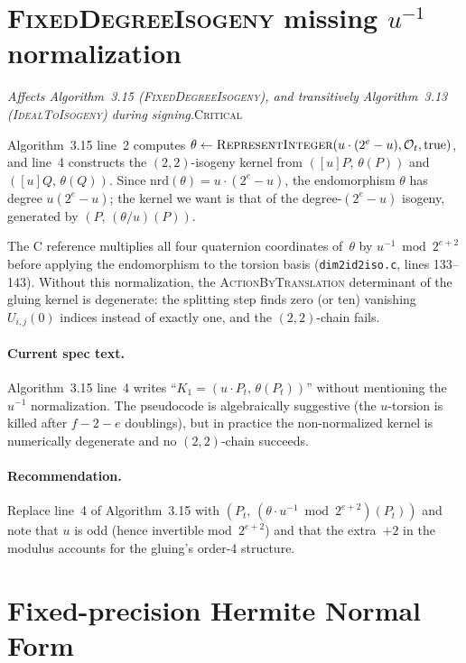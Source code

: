 \documentclass[a4paper,11pt]{article}
\newcommand{\algo}[1]{Algorithm~#1}
\newcommand{\critical}{\textsc{\color{BrickRed}Critical}}
\newcommand{\finding}[2]{\noindent\textit{#1}\hfill#2\par\smallskip}
\begin{document}
\section{\textsc{FixedDegreeIsogeny} missing $u^{-1}$ normalization}
\label{sec:u-inv}

\finding{Affects \algo{3.15}
(\textsc{FixedDegreeIsogeny}), and transitively \algo{3.13}
(\textsc{IdealToIsogeny}) during signing.}{\critical}

\algo{3.15} line~2 computes
$\theta \leftarrow \textsc{RepresentInteger}(u \cdot (2^{e} - u),
\mathcal{O}_t, \mathrm{true})$, and line~4 constructs the
$(2,2)$-isogeny kernel from $([u]P,\, \theta(P))$ and
$([u]Q,\, \theta(Q))$.  Since $\mathrm{nrd}(\theta) = u \cdot
(2^{e} - u)$, the endomorphism $\theta$ has degree
$u (2^{e} - u)$; the kernel we want is that of the degree-$(2^{e}-u)$
isogeny, generated by $(P,\, (\theta/u)(P))$.

The C reference multiplies all four quaternion coordinates of~$\theta$
by $u^{-1} \bmod 2^{e+2}$ before applying the endomorphism to the
torsion basis (\texttt{dim2id2iso.c}, lines 133--143).  Without this
normalization, the \textsc{ActionByTranslation} determinant of the
gluing kernel is degenerate: the splitting step finds zero (or ten)
vanishing~$U_{i,j}(0)$ indices instead of exactly one, and the
$(2,2)$-chain fails.

\paragraph{Current spec text.}
\algo{3.15} line~4 writes ``$K_1 = (u \cdot P_t,\, \theta(P_t))$''
without mentioning the $u^{-1}$ normalization.  The pseudocode is
algebraically suggestive (the $u$-torsion is killed after $f{-}2{-}e$
doublings), but in practice the non-normalized kernel is numerically
degenerate and no $(2,2)$-chain succeeds.

\paragraph{Recommendation.}
Replace line~4 of \algo{3.15} with
$(P_t,\, (\theta \cdot u^{-1} \bmod 2^{e+2})(P_t))$ and note
that $u$ is odd (hence invertible mod~$2^{e+2}$) and that the
extra~$+2$ in the modulus accounts for the gluing's order-4
structure.

\section{Fixed-precision Hermite Normal Form}
\label{sec:hnf}
\end{document}
